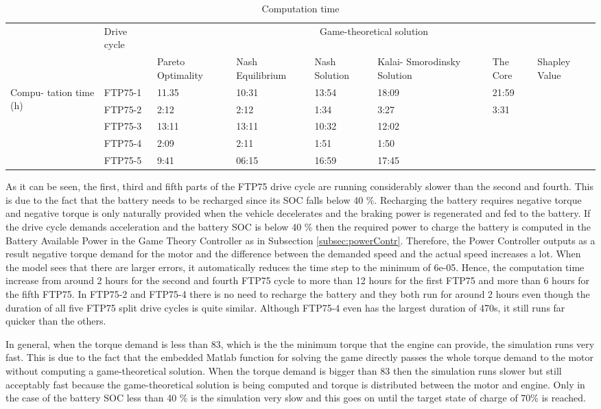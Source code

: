 \begin{table}[h]
\centering
\begin{tabular}{ |p{1.5cm}|p{1.5cm}|p{1.3cm}|p{1.3cm}|p{1.3cm}|p{1.3cm}|p{1.3cm}|p{1.3cm}|} 
 \hline
  \cline{3-8}
   & Drive cycle & \multicolumn{6}{|c|}{Game-theoretical solution} \\
   \cline{3-8}
   & & Pareto Optimality & Nash Equilibrium & Nash Solution & Kalai- Smorodinsky Solution & The Core & Shapley Value\\
 \hline\hline
 \multirow{5}{*}{\parbox{1.5cm}{Compu- tation time (h)}} 
 & FTP75-1 & 11.35 & 10:31 & 13:54 & 18:09 & 21:59 & \\ 
 & FTP75-2 & 2:12 & 2:12 & 1:34 & 3:27 & 3:31 & \\ 
 & FTP75-3 & 13:11 & 13:11 & 10:32 & 12:02 & & \\ 
 & FTP75-4 & 2:09 & 2:11 & 1:51 & 1:50 & & \\ 
 & FTP75-5 & 9:41 & 06:15 & 16:59 & 17:45 & & \\ 
 \hline
\end{tabular}
\caption{Computation time}
\label{tab:config}
\end{table}

As it can be seen, the first, third and fifth parts of the FTP75 drive cycle are running considerably slower than the second and fourth. This is due to the fact that the battery needs to be recharged since its SOC falls below 40 \%. Recharging the battery requires negative torque and negative torque is only naturally provided when the vehicle decelerates and the braking power is regenerated and fed to the battery. If the drive cycle demands acceleration and the battery SOC is below 40 \% then the required power to charge the battery is computed in the Battery Available Power in the Game Theory Controller as in Subsection \ref{subsec:powerContr}. Therefore, the Power Controller outputs as a result negative torque demand for the motor and the difference between the demanded speed and the actual speed increases a lot. When the model sees that there are larger errors, it automatically reduces the time step to the minimum of 6e-05. Hence, the computation time increase from around 2 hours for the second and fourth FTP75 cycle to more than 12 hours for the first FTP75 and more than 6 hours for the fifth FTP75. In FTP75-2 and FTP75-4 there is no need to recharge the battery and they both run for around 2 hours even though the duration of all five FTP75 split drive cycles is quite similar. Although FTP75-4 even has the largest duration of 470s, it still runs far quicker than the others.

In general, when the torque demand is less than 83, which is the the minimum torque that the engine can provide, the simulation runs very fast. This is due to the fact that the embedded Matlab function for solving the game directly passes the whole torque demand to the motor without computing a game-theoretical solution. When the torque demand is bigger than 83 then the simulation runs slower but still acceptably fast because the game-theoretical solution is being computed and torque is distributed between the motor and engine. Only in the case of the battery SOC less than 40 \% is the simulation very slow and this goes on until the target state of charge of 70\% is reached.